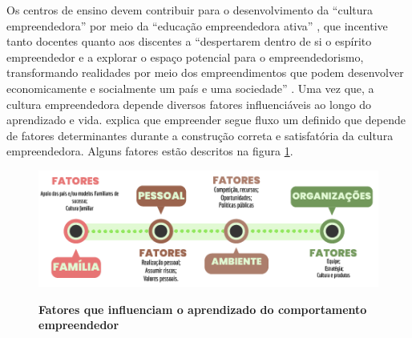 




Os centros de ensino devem contribuir para o desenvolvimento da “cultura empreendedora” por meio da “educação empreendedora ativa” \cite{tscha_empreendendo_2014}, que incentive tanto docentes quanto aos discentes a “despertarem dentro de si o espírito empreendedor e a explorar o espaço potencial para o empreendedorismo, transformando realidades por meio dos empreendimentos que podem desenvolver economicamente e socialmente um país e uma sociedade” \cite{tscha_empreendendo_2014}. Uma vez que, a cultura empreendedora depende diversos fatores influenciáveis ao longo do aprendizado e vida. \cite{dornelas_empreendedorismo_2005} explica que empreender segue fluxo um definido que depende de fatores determinantes durante a construção correta e satisfatória da cultura empreendedora. Alguns fatores estão descritos na figura \ref{figura_2}.

\begin{figure}[H]
\centering
\caption{\textbf{Fatores que influenciam o aprendizado do comportamento empreendedor}}
\includegraphics[scale=1]{Imagens/esquema_influencias_empreendedorismo.png}
\label{figura_2}
\end{figure}


